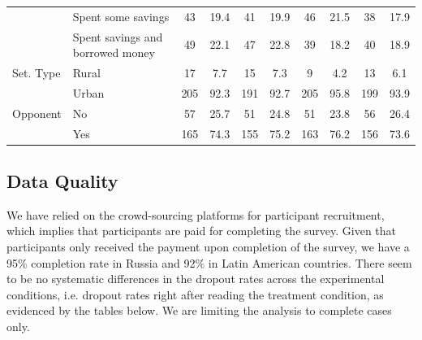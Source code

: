 \documentclass[11pt, ngerman,english,a4]{article}
\begin{document}
\begin{table}[!htbp]
{\begin{tabular}[t]{llcccccccc}
 & Spent some savings & 43 & 19.4 & 41 & 19.9 & 46 & 21.5 & 38 & 17.9\\
 & Spent savings and
borrowed money & 49 & 22.1 & 47 & 22.8 & 39 & 18.2 & 40 & 18.9\\
Set. Type & Rural & 17 & 7.7 & 15 & 7.3 & 9 & 4.2 & 13 & 6.1\\
 & Urban & 205 & 92.3 & 191 & 92.7 & 205 & 95.8 & 199 & 93.9\\
Opponent & No & 57 & 25.7 & 51 & 24.8 & 51 & 23.8 & 56 & 26.4\\
 & Yes & 165 & 74.3 & 155 & 75.2 & 163 & 76.2 & 156 & 73.6\\
\bottomrule
\end{tabular}}
\end{table}

\newpage

\subsection{Data Quality}

We have relied on the crowd-sourcing platforms for participant recruitment, which implies that participants are paid for completing the survey. Given that participants only received the payment upon completion of the survey, we have a 95\% completion rate in Russia and 92\% in Latin American countries. There seem to be no systematic differences in the dropout rates across the experimental conditions, i.e. dropout rates right after reading the treatment condition, as evidenced by the tables below. We are limiting the analysis to complete cases only. 

\end{document}
